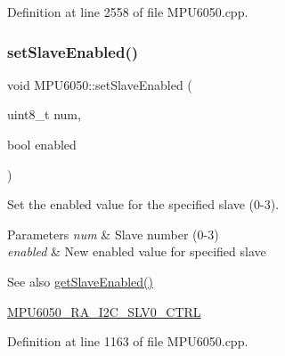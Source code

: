 Definition at line 2558 of file M\+P\+U6050.\+cpp.


\begin{DoxyCode}{0}

\end{DoxyCode}
\mbox{\label{classMPU6050_afaffa021d7bb41f3a288827080602eee}} 
\subsubsection{\texorpdfstring{setSlaveEnabled()}{setSlaveEnabled()}}
{\footnotesize\ttfamily void M\+P\+U6050\+::set\+Slave\+Enabled (\begin{DoxyParamCaption}\item[{uint8\+\_\+t}]{num,  }\item[{bool}]{enabled }\end{DoxyParamCaption})}

Set the enabled value for the specified slave (0-\/3). 
\begin{DoxyParams}{Parameters}
{\em num} & Slave number (0-\/3) \\
\hline
{\em enabled} & New enabled value for specified slave \\
\hline
\end{DoxyParams}
\begin{DoxySeeAlso}{See also}
\mbox{\hyperlink{classMPU6050_a5f14bde83fe00b27dec6776fc44e89c2}{get\+Slave\+Enabled()}} 

\mbox{\hyperlink{MPU6050_8h_a70ce4d71982a1e3fb2be9b71f40da786}{M\+P\+U6050\+\_\+\+R\+A\+\_\+\+I2\+C\+\_\+\+S\+L\+V0\+\_\+\+C\+T\+RL}} 
\end{DoxySeeAlso}


Definition at line 1163 of file M\+P\+U6050.\+cpp.


